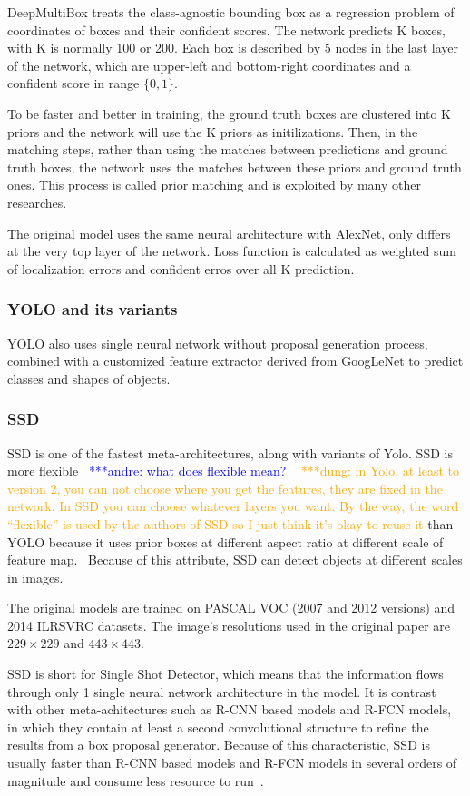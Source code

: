 \documentclass[conference]{IEEEtran}
\newcommand{\alnote}[1]{ {\textcolor{blue} { ***andre: #1 }}}
\newcommand{\dungnote}[1]{ {\textcolor{orange} { ***dung: #1 }}}
\newcommand{\alnote}[1]{}
\newcommand{\dungnote}[1]{}
\begin{document}
DeepMultiBox treats the class-agnostic bounding box as a regression problem of coordinates of boxes and their confident scores. The network predicts K boxes, with K is normally 100 or 200. Each box is described by 5 nodes in the last layer of the network, which are upper-left and bottom-right coordinates and a confident score in range $\{0, 1\}$.

To be faster and better in training, the ground truth boxes are clustered into K priors and the network will use the K priors as initilizations. Then, in the matching steps, rather than using the matches between predictions and ground truth boxes, the network uses the matches between these priors and ground truth ones. This process is called prior matching and is exploited by many other researches.

The original model uses the same neural architecture with AlexNet, only differs at the very top layer of the network. Loss function is calculated as weighted sum of localization errors and confident erros over all K prediction.


\subsubsection{YOLO and its variants}
YOLO also uses single neural network without proposal generation process, combined with a customized feature extractor derived from GoogLeNet to predict classes and shapes of objects.


\subsubsection{SSD}
SSD is one of the fastest meta-architectures, along with variants of Yolo. SSD is more flexible~\alnote{what does flexible mean?} ~\dungnote{in Yolo, at least to version 2, you can not choose where you get the features, they are fixed in the network. In SSD you can choose whatever layers you want. By the way, the word ``flexible'' is used by the authors of SSD so I just think it's okay to reuse it}than YOLO because it uses prior boxes at different aspect ratio at different scale of feature map.~\cite{liu2016ssd} Because of this attribute, SSD can detect objects at different scales in images.

The original models are trained on PASCAL VOC (2007 and 2012 versions) and 2014 ILRSVRC datasets. The image's resolutions used in the original paper are $229 \times 229$ and $443 \times 443$.

SSD is short for Single Shot Detector, which means that the information flows through only 1 single neural network architecture in the model. It is contrast with other meta-achitectures such as R-CNN based models and R-FCN models, in which they contain at least a second convolutional structure to refine the results from a box proposal generator. Because of this characteristic, SSD is usually faster than R-CNN based models and R-FCN models in several orders of magnitude and consume less resource to run~\cite{huang2017speed}.
\end{document}
